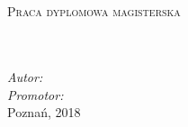 \documentclass[
12pt, %
oneside, %
polish, %
onehalfspacing, %
headsepline, %
chapterinoneline, %
]{MastersDoctoralThesis} %
\author{inż Przemysław \textsc{Sałapata}} %
\begin{document}
\selectfont

% 
\pagestyle{plain} %

\begin{titlepage}
	\begin{center}
		
		\vspace*{.06\textheight}
		{\scshape\LARGE \univname\par}%


		\groupname\\\deptname\\[2cm] %
		 

		\textsc{\Large Praca dyplomowa magisterska}\\[0.5cm] %
		
		\HRule \\[0.4cm] %
		{\huge \bfseries \ttitle\par}\vspace{0.4cm} %
		\HRule \\[1.5cm] %
		
				\emph{Autor:}
				\href{mailto:przemyslaw.salapata1@gmail.com}{\authorname} %
		\\
				\emph{Promotor:}
				\href{mailto:krzysztof.budnik@put.poznan.pl}{\supname} %
		\\[8cm]



{\large Poznań, 2018} %

\vfill
\end{center}
\end{titlepage}
\end{document}
